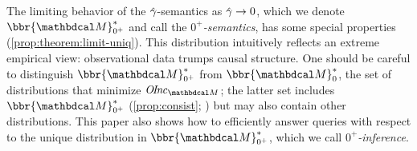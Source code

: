 The limiting behavior of the $\zogamma$-semantics as $\zogamma \to 0$,
which we denote $\bbr{\dg M}^*_{0^+}$ and call the \emph{$0^+$\!-semantics},
has some special properties (\cref{prop:theorem:limit-uniq}).
This distribution intuitively
reflects an extreme empirical
view: observational data trumps causal structure.
One should be careful to distinguish 
$\bbr{\dg M}^*_{0^+}$
from $\bbr{\dg M}^*_0$,
the set of distributions that minimize
$\OInc_{\dg M}$; the latter  set
includes
 $\bbr{\dg M}^*_{0^+}$
(\cref{prop:consist}; \parencite{pdg-aaai})
but may also contain other distributions.
This paper also shows how to efficiently answer queries with respect 
to the unique distribution in $\bbr{\dg M}^*_{0^+}$, which we call
\emph{$0^+$\!-inference}.




